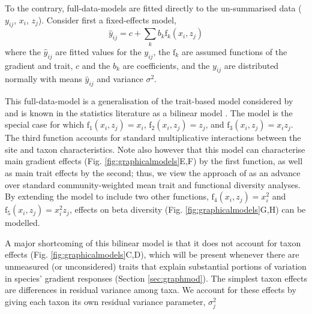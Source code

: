 \documentclass[12pt]{ecology}
\begin{document}
To the contrary, full-data-models are fitted directly to the un-summarised data ($y_{ij}$, $x_i$, $z_j$).  Consider first a fixed-effects model,
\begin{equation}
\hat{y}_{ij} = c + 
	\sum_k b_k \mathrm{f}_k (x_i, z_j)
\label{eq:fixed}
\end{equation}
where the $\hat{y}_{ij}$ are fitted values for the $y_{ij}$, the $\mathrm{f}_k$ are assumed functions of the gradient and trait, $c$ and the $b_k$ are coefficients, and the $y_{ij}$ are distributed normally with means $\hat{y}_{ij}$ and variance $\sigma^2$.

This full-data-model is a generalisation of the trait-based model considered by \citet{CormontEtAl2011} and is known in the statistics literature as a bilinear model \citep{Gabriel1998}.  The \citet{CormontEtAl2011} model is the special case for which $\mathrm{f}_1(x_i, z_j) = x_i$, $\mathrm{f}_2(x_i, z_j) = z_j$, and $\mathrm{f}_3(x_i, z_j) = x_i z_j$.  The third function accounts for standard multiplicative interactions between the site and taxon characteristics.  Note also however that this model can characterise main gradient effects (Fig. \ref{fig:graphicalmodels}E,F) by the first function, as well as main trait effects by the second; thus, we view the approach of \citet{CormontEtAl2011} as an advance over standard community-weighted mean trait and functional diversity analyses.  By extending the model to include two other functions, $\mathrm{f}_4(x_i, z_j) = x_i^2$ and $\mathrm{f}_5(x_i, z_j) = x_i^2 z_j$, effects on beta diversity (Fig. \ref{fig:graphicalmodels}G,H) can be modelled.


A major shortcoming of this bilinear model is that it does not account for taxon effects (Fig. \ref{fig:graphicalmodels}C,D), which will be present whenever there are unmeasured (or unconsidered) traits that explain substantial portions of variation in species' gradient responses (Section \ref{sec:graphmod}).  The simplest taxon effects are differences in residual variance among taxa.  We account for these effects by giving each taxon its own residual variance parameter, $\sigma_j^2$
\end{document}
